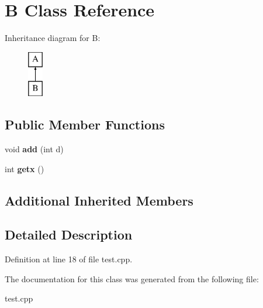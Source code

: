 \hypertarget{class_b}{}\section{B Class Reference}
\label{class_b}
Inheritance diagram for B\+:\begin{figure}[H]
\begin{center}
\leavevmode
\includegraphics[height=2.000000cm]{class_b}
\end{center}
\end{figure}
\subsection*{Public Member Functions}
\begin{DoxyCompactItemize}
\item 
\mbox{\label{class_b_af3dba524b3a393aa889c05fb0af84a68}} 
void {\bfseries add} (int d)
\item 
\mbox{\label{class_b_ac47f9c3ac0f0e15c08ee8898da83aa73}} 
int {\bfseries getx} ()
\end{DoxyCompactItemize}
\subsection*{Additional Inherited Members}


\subsection{Detailed Description}


Definition at line 18 of file test.\+cpp.



The documentation for this class was generated from the following file\+:\begin{DoxyCompactItemize}
\item 
test.\+cpp\end{DoxyCompactItemize}
